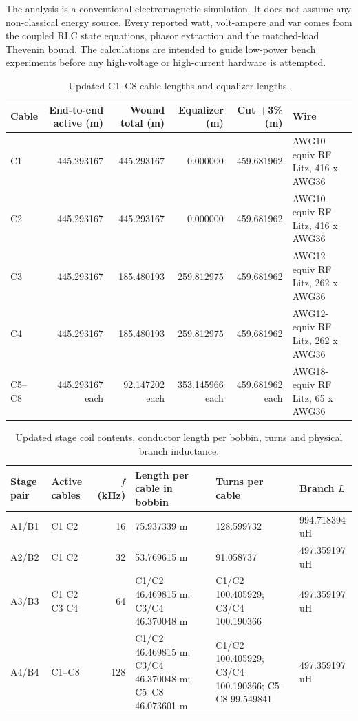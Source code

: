 The analysis is a conventional electromagnetic simulation. It does not assume
any non-classical energy source. Every reported watt, volt-ampere and var comes
from the coupled RLC state equations, phasor extraction and the matched-load
Thevenin bound. The calculations are intended to guide low-power bench
experiments before any high-voltage or high-current hardware is attempted.

\begin{table}[H]
\centering
\caption{Updated C1--C8 cable lengths and equalizer lengths.}
\label{tab:updated-cable-lengths}
\small
\begin{tabular}{lrrrrl}
\toprule
Cable & End-to-end active (m) & Wound total (m) & Equalizer (m) & Cut +3\% (m) & Wire \\
\midrule
C1 & 445.293167 & 445.293167 & 0.000000 & 459.681962 & AWG10-equiv RF Litz, 416 x AWG36 \\
C2 & 445.293167 & 445.293167 & 0.000000 & 459.681962 & AWG10-equiv RF Litz, 416 x AWG36 \\
C3 & 445.293167 & 185.480193 & 259.812975 & 459.681962 & AWG12-equiv RF Litz, 262 x AWG36 \\
C4 & 445.293167 & 185.480193 & 259.812975 & 459.681962 & AWG12-equiv RF Litz, 262 x AWG36 \\
C5--C8 & 445.293167 each & 92.147202 each & 353.145966 each & 459.681962 each & AWG18-equiv RF Litz, 65 x AWG36 \\
\bottomrule
\end{tabular}
\end{table}

\begin{table}[H]
\centering
\caption{Updated stage coil contents, conductor length per bobbin, turns and physical branch inductance.}
\label{tab:updated-stage-coils}
\small
\begin{tabular}{llrlll}
\toprule
Stage pair & Active cables & \(f\) (kHz) & Length per cable in bobbin & Turns per cable & Branch \(L\) \\
\midrule
A1/B1 & C1 C2 & 16 & 75.937339 m & 128.599732 & 994.718394 uH \\
A2/B2 & C1 C2 & 32 & 53.769615 m & 91.058737 & 497.359197 uH \\
A3/B3 & C1 C2 C3 C4 & 64 & C1/C2 46.469815 m; C3/C4 46.370048 m & C1/C2 100.405929; C3/C4 100.190366 & 497.359197 uH \\
A4/B4 & C1--C8 & 128 & C1/C2 46.469815 m; C3/C4 46.370048 m; C5--C8 46.073601 m & C1/C2 100.405929; C3/C4 100.190366; C5--C8 99.549841 & 497.359197 uH \\
\bottomrule
\end{tabular}
\end{table}

